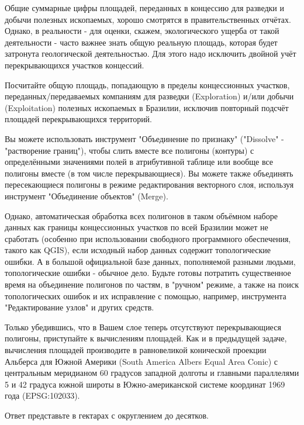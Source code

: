 
Общие суммарные цифры площадей, переданных в концессию для разведки и добычи полезных ископаемых, хорошо смотрятся в правительственных отчётах. Однако, в реальности - для оценки, скажем, экологического ущерба от такой деятельности - часто важнее знать общую реальную площадь, которая будет затронута геологической деятельностью. Для этого надо исключить двойной учёт перекрывающихся участков концессий.

Посчитайте общую площадь, попадающую в пределы концессионных участков, переданных/передаваемых компаниям 
для разведки (Exploration) и/или добычи \linebreak (Exploitation) полезных ископаемых в Бразилии, исключив повторный подсчёт площадей перекрывающихся территорий.

Вы можете использовать инструмент "Объединение по признаку" ("Dissolve" - "растворение границ"), чтобы слить вместе все полигоны (контуры) с определёнными значениями полей в атрибутивной таблице или вообще все полигоны вместе (в том числе перекрывающиеся). Вы можете также объединять пересекающиеся полигоны в режиме редактирования векторного слоя, используя инструмент "Объединение объектов" (Merge).

Однако, автоматическая обработка всех полигонов в таком объёмном наборе данных как границы концессионных участков по всей Бразилии может не сработать (особенно при использовании свободного программного обеспечения, такого как QGIS), если исходный набор данных содержит топологические ошибки. А в большой официальной базе данных, пополняемой разными людьми, топологические ошибки - обычное дело. Будьте готовы потратить существенное время на объединение полигонов по частям, в "ручном" режиме, а также на поиск топологических ошибок и их исправление с помощью, например, инструмента "Редактирование узлов" и других средств.

Только убедившись, что в Вашем слое теперь отсутствуют перекрывающиеся полигоны, приступайте к вычислениям площадей. Как и в предыдущей задаче, вычисления площадей производите в равновеликой конической проекции Альберса для Южной Америки (South America Albers Equal Area Conic) с центральным меридианом 60 градусов западной долготы и главными параллелями 5 и 42 градуса южной широты в Южно-американской системе координат 1969 года (EPSG:102033).

Ответ представьте в гектарах с округлением до десятков.
